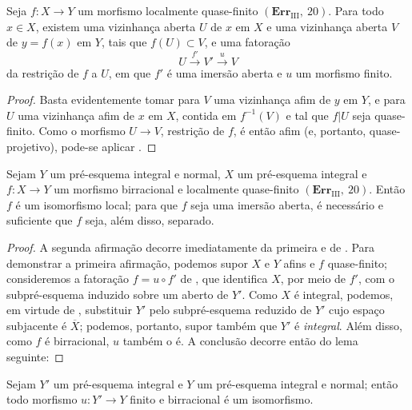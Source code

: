 
\begin{corollary}[8.12.9]
\label{IV.8.12.9}
Seja $f:X\to Y$ um morfismo localmente quase-finito $(\mathbf{Err}_{\text{III}},~20)$.
Para todo $x\in X$, existem uma vizinhança aberta $U$ de $x$ em $X$ e uma vizinhança aberta $V$ de $y=f(x)$ em $Y$, tais que $f(U)\subset V$, e uma fatoração
\[
U\xrightarrow{f'}V'\xrightarrow{u}V
\]
da restrição de $f$ a $U$, em que $f'$ é uma imersão aberta e $u$ um morfismo finito.
\end{corollary}

\begin{proof}
Basta evidentemente tomar para $V$ uma vizinhança afim de $y$ em $Y$, e para $U$ uma vizinhança afim de $x$ em $X$, contida em $f^{-1}(V)$ e tal que $f|U$ seja quase-finito.
Como o morfismo $U\to V$, restrição de $f$, é então afim (e, portanto, quase-projetivo), pode-se aplicar .
\end{proof}

\begin{corollary}[8.12.10]
\label{IV.8.12.10}
Sejam $Y$ um pré-esquema integral e normal, $X$ um pré-esquema integral e $f:X\to Y$ um morfismo birracional e localmente quase-finito $(\mathbf{Err}_{\text{III}},~20)$.
Então $f$ é um isomorfismo local; para que $f$ seja uma imersão aberta, é necessário e suficiente que $f$ seja, além disso, separado.
\end{corollary}

\begin{proof}
A segunda afirmação decorre imediatamente da primeira e de .
Para demonstrar a primeira afirmação, podemos supor $X$ e $Y$ afins e $f$ quase-finito; consideremos a fatoração $f=u\circ f'$ de , que identifica $X$, por meio de $f'$, com o subpré-esquema induzido sobre um aberto de $Y'$.
Como $X$ é integral, podemos, em virtude de , substituir $Y'$ pelo subpré-esquema reduzido de $Y'$ cujo espaço subjacente é $\overline{X}$; podemos, portanto, supor também que $Y'$ é \emph{integral}.
Além disso, como $f$ é birracional, $u$ também o é.
A conclusão decorre então do lema seguinte:
\end{proof}

\begin{lemma}[8.12.10.1]
\label{IV.8.12.10.1}
Sejam $Y'$ um pré-esquema integral e $Y$ um pré-esquema integral e normal; então todo morfismo $u:Y'\to Y$ finito e birracional é um isomorfismo.
\end{lemma}

